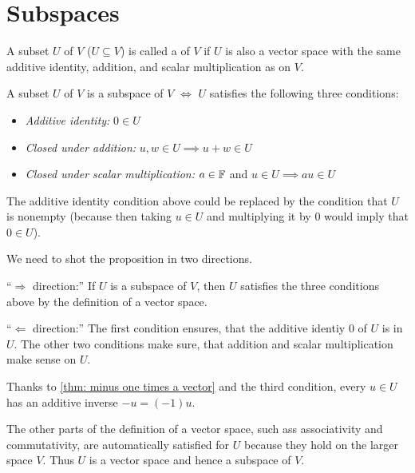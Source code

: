 \section{Subspaces}

\begin{mydef} [subspace]
  A subset $U$ of $V$ ($U \subseteq V$) is called a  of $V$ if $U$ is also a vector space with the same additive identity, addition, and scalar multiplication as on $V$.
\end{mydef}

\begin{thm} 
  A subset $U$ of $V$ is a subspace of $V$ $\iff$ $U$ satisfies the following three conditions:
  \begin{itemize}
    \item \emph{Additive identity:}
    $0 \in U$
    \item \emph{Closed under addition:}
    $u,w \in U \implies u+w \in U$
    \item \emph{Closed under scalar multiplication:}
    $a \in \mathbb{F}$ and $u \in U \implies au \in U$
  \end{itemize}
  The additive identity condition above could be replaced by the condition that $U$ is nonempty (because then taking $u \in U$ and multiplying it by $0$ would imply that $0\in U$).
\end{thm}
\begin{prf} We need to shot the proposition in two directions.
  \begin{description} 
    \item{``$\Rightarrow$ direction:''} If $U$ is a subspace of $V$, then $U$ satisfies the three conditions above by the definition of a vector space.
    \item{``$\Leftarrow$ direction:''} The first condition ensures, that the additive identiy $0$ of $U$ is in $U$. The other two conditions make sure, that addition and scalar multiplication make sense on $U$.
    
    Thanks to \ref{thm: minus one times a vector} and the third condition, every $u \in U$ has an additive inverse $-u = (-1) u$.
    
    The other parts of the definition of a vector space, such ass associativity and commutativity, are automatically satisfied for $U$ because they hold on the larger space $V$. Thus $U$ is a vector space and hence a subspace of $V$.
  \end{description}
  \vspace{-1.1em}
\end{prf}

